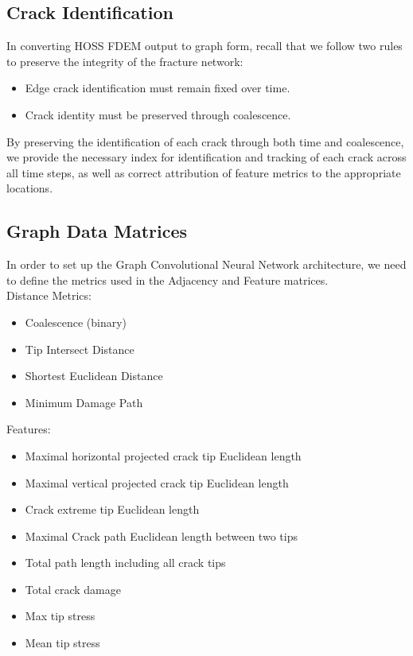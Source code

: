 \subsection{Crack Identification}
In converting HOSS FDEM output to graph form, recall that we follow two rules to preserve the integrity of the fracture network:
\begin{itemize}
	\item Edge crack identification must remain fixed over time.
 	\item Crack identity must be preserved through coalescence.
\end{itemize} 
By preserving the identification of each crack through both time and coalescence, we provide the necessary index for identification and tracking of each crack across all time steps, as well as correct attribution of feature metrics to the appropriate locations.
          
\subsection{Graph Data Matrices}
In order to set up the Graph Convolutional Neural Network architecture, we need to define the metrics used in the Adjacency and Feature matrices.\\
Distance Metrics:
        \begin{itemize}
        \item Coalescence (binary)
        \item Tip Intersect Distance  
        \item Shortest Euclidean Distance
        \item Minimum Damage Path
        \end{itemize}       
Features:
    \begin{itemize}
	\item Maximal horizontal projected crack tip Euclidean length
	\item Maximal vertical projected crack tip Euclidean length 
	\item Crack extreme tip Euclidean length
    \item Maximal Crack path Euclidean length between two tips
    \item Total path length including all crack tips
    \item Total crack damage
    \item Max tip stress
    \item Mean tip stress
	\end{itemize}
    
